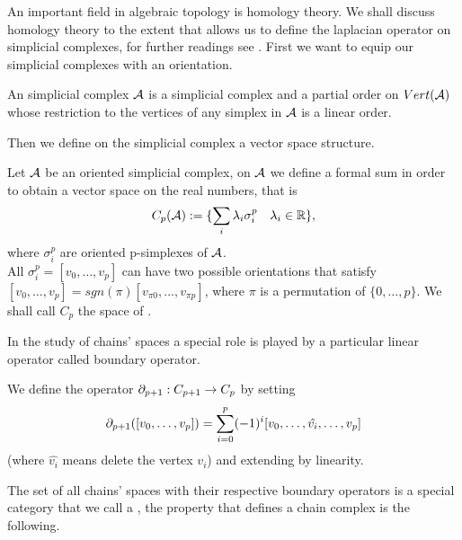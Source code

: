 \documentclass[../1.tex]{subfiles}
\begin{document}
    An important field in algebraic topology is homology theory. We shall discuss homology theory to the extent
    that allows us to define the laplacian operator on simplicial complexes, for further readings see \cite{hatcher}.
    First we want to equip our simplicial complexes with an orientation.

    \begin{defn}
        An  simplicial complex $\mathcal{A}$ is a simplicial complex and a partial order on $Vert(\mathcal{A})$ whose
        restriction to the vertices of any simplex in $\mathcal{A}$ is a linear order.
    \end{defn}

    Then we define on the simplicial complex a vector space structure.

    \begin{defn}
        Let $\mathcal{A}$ be an oriented simplicial complex, on $\mathcal{A}$ we define a formal sum in order
        to obtain a vector space on the real numbers, that is
        \[ C_p(\mathcal{A}) := \{ \sum_i \lambda_i \sigma_i^p \quad \lambda_i \in \mathbb{R} \},\]
        where $\sigma_i^p$ are oriented p-simplexes of $\mathcal{A}$.\\ %
        All $\sigma_i^p = [v_0,\dots,v_p]$ can have two possible orientations that satisfy
        $ [v_0,\dots,v_p] = sgn (\pi)[v_{\pi 0},\dots,v_{\pi p}]$,
        where $\pi$ is a permutation of $\{0,\dots,p\}$.  
        We shall call $C_p$ the space of .      
    \end{defn}

    In the study of chains' spaces a special role is played by a particular linear operator called
    boundary operator.

    \begin{defn}
        We define the  operator $\partial_{p+1} : C_{p+1} \to C_p$ by setting
        \[ \partial_{p+1}([v_0,\dots,v_p]) = \sum_{i=0}^p (-1)^i[v_0,\dots,\hat{v_i},\dots,v_p] \]
        (where $\hat{v_i}$ means delete the vertex $v_i$) and extending by linearity.
    \end{defn}

   The set of all chains' spaces with their respective boundary operators is a special category that we call a ,
   the property that defines a chain complex is the following.
\end{document}
